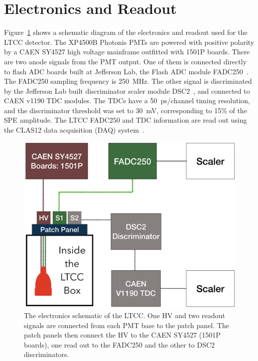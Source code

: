 \section{Electronics and Readout}

Figure~\ref{fig:electronicScheme} shows a schematic diagram of the electronics and readout used for the LTCC
detector. The XP4500B Photonis PMTs are powered with positive polarity by a CAEN SY4527 high voltage
mainframe outfitted with 1501P boards. There are two anode signals from the PMT output. One of them is
connected directly to flash ADC boards built at Jefferson Lab, the Flash ADC module FADC250~\cite{daq-nim}.
The FADC250 sampling frequency is 250~MHz. The other signal is discriminated by the Jefferson Lab built
discriminator scaler module DSC2~\cite{daq-nim}, and connected to CAEN v1190 TDC modules. The TDCs have a
50~ps/channel timing resolution, and the discriminator threshold was set to 30~mV, corresponding to 15\% of the
SPE amplitude. The LTCC FADC250 and TDC information are read out using the CLAS12 data acquisition (DAQ)
system~\cite{daq-nim}.

\begin{figure}
	\centering
	\includegraphics[width=0.99\columnwidth,keepaspectratio]{img/electronicScheme.png}
	\caption{The electronics schematic of the LTCC. One HV and two readout signals are connected from each PMT
          base to the patch panel. The patch panels then connect the HV to the CAEN SY4527 (1501P boards), one read
          out to the FADC250 and the other to DSC2 discriminators.}
	\label{fig:electronicScheme}
\end{figure}

